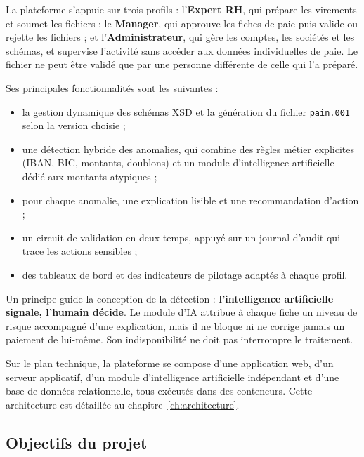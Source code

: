 La plateforme s'appuie sur trois profils : l'\textbf{Expert RH}, qui prépare les virements et soumet les fichiers ; le \textbf{Manager}, qui approuve les fiches de paie puis valide ou rejette les fichiers ; et l'\textbf{Administrateur}, qui gère les comptes, les sociétés et les schémas, et supervise l'activité sans accéder aux données individuelles de paie. Le fichier ne peut être validé que par une personne différente de celle qui l'a préparé.

Ses principales fonctionnalités sont les suivantes :
\begin{itemize}
    \item la gestion dynamique des schémas XSD et la génération du fichier \texttt{pain.001} selon la version choisie ;
    \item une détection hybride des anomalies, qui combine des règles métier explicites (IBAN, BIC, montants, doublons) et un module d'intelligence artificielle dédié aux montants atypiques ;
    \item pour chaque anomalie, une explication lisible et une recommandation d'action ;
    \item un circuit de validation en deux temps, appuyé sur un journal d'audit qui trace les actions sensibles ;
    \item des tableaux de bord et des indicateurs de pilotage adaptés à chaque profil.
\end{itemize}

Un principe guide la conception de la détection : \textbf{l'intelligence artificielle signale, l'humain décide}. Le module d'IA attribue à chaque fiche un niveau de risque accompagné d'une explication, mais il ne bloque ni ne corrige jamais un paiement de lui-même. Son indisponibilité ne doit pas interrompre le traitement.

Sur le plan technique, la plateforme se compose d'une application web, d'un serveur applicatif, d'un module d'intelligence artificielle indépendant et d'une base de données relationnelle, tous exécutés dans des conteneurs. Cette architecture est détaillée au chapitre~\ref{ch:architecture}.

\subsection{Objectifs du projet}

